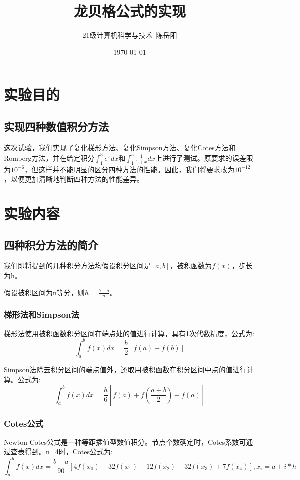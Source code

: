 \documentclass{article}
\title{龙贝格公式的实现}
\author{21级计算机科学与技术\ 陈岳阳}
\date{\today}
\begin{document}
\maketitle
\tableofcontents

\section{实验目的}

	\subsection{实现四种数值积分方法}
这次试验，我们实现了复化梯形方法、复化Simpson方法、复化Cotes方法和Romberg方法，并在给定积分$\int_1^3e^xdx$和$\int_1^5\frac{1}{1+x}dx$上进行了测试。原要求的误差限为$10^{-6}$，但这样并不能明显的区分四种方法的性能。因此，我们将要求改为$10^{-12}$，以便更加清晰地判断四种方法的性能差异。


\section{实验内容}

	\subsection{四种积分方法的简介}
	
我们即将提到的几种积分方法均假设积分区间是$[a,b]$，被积函数为$f(x)$，步长为h。

假设被积区间为n等分，则$h=\frac{b-a}{n}$。

		\subsubsection{梯形法和Simpson法}

梯形法使用被积函数积分区间在端点处的值进行计算，具有1次代数精度，公式为: $$\int_a^bf(x)dx=\frac{h}{2}[f(a)+f(b)]$$

Simpson法除去积分区间的端点值外，还取用被积函数在积分区间中点的值进行计算。公式为: $$\int_a^bf(x)dx=\frac{h}{6}[f(a)+f(\frac{a+b}{2})+f(a)]$$

		\subsubsection{Cotes公式}

Newton-Cotes公式是一种等距插值型数值积分。节点个数确定时，Cotes系数可通过查表得到。n=4时，Cotes公式为: $$\int_a^bf(x)dx=\frac{b-a}{90}[4f(x_0)+32f(x_1)+12f(x_2)+32f(x_3)+7f(x_4)], x_i=a+i*h$$
\end{document}
